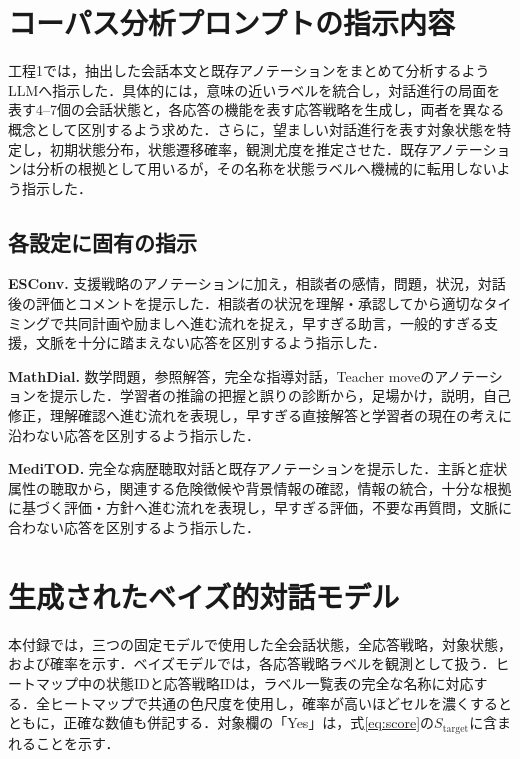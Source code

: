 \section{コーパス分析プロンプトの指示内容}
\label{app:prompts}

工程1では，抽出した会話本文と既存アノテーションをまとめて分析するようLLMへ指示した．具体的には，意味の近いラベルを統合し，対話進行の局面を表す4--7個の会話状態と，各応答の機能を表す応答戦略を生成し，両者を異なる概念として区別するよう求めた．さらに，望ましい対話進行を表す対象状態を特定し，初期状態分布，状態遷移確率，観測尤度を推定させた．既存アノテーションは分析の根拠として用いるが，その名称を状態ラベルへ機械的に転用しないよう指示した．

\subsection{各設定に固有の指示}

\noindent\textbf{ESConv.} 支援戦略のアノテーションに加え，相談者の感情，問題，状況，対話後の評価とコメントを提示した．相談者の状況を理解・承認してから適切なタイミングで共同計画や励ましへ進む流れを捉え，早すぎる助言，一般的すぎる支援，文脈を十分に踏まえない応答を区別するよう指示した．

\noindent\textbf{MathDial.} 数学問題，参照解答，完全な指導対話，Teacher moveのアノテーションを提示した．学習者の推論の把握と誤りの診断から，足場かけ，説明，自己修正，理解確認へ進む流れを表現し，早すぎる直接解答と学習者の現在の考えに沿わない応答を区別するよう指示した．

\noindent\textbf{MediTOD.} 完全な病歴聴取対話と既存アノテーションを提示した．主訴と症状属性の聴取から，関連する危険徴候や背景情報の確認，情報の統合，十分な根拠に基づく評価・方針へ進む流れを表現し，早すぎる評価，不要な再質問，文脈に合わない応答を区別するよう指示した．

\section{生成されたベイズ的対話モデル}
\label{app:models}

\newcommand{\BasisHeatCell}[1]{%
  \cellcolor{basisMatrixHeat!\fpeval{round(#1*85,0)}}\strut #1}

本付録では，三つの固定モデルで使用した全会話状態，全応答戦略，対象状態，および確率を示す．ベイズモデルでは，各応答戦略ラベルを観測として扱う．ヒートマップ中の状態IDと応答戦略IDは，ラベル一覧表の完全な名称に対応する．全ヒートマップで共通の色尺度を使用し，確率が高いほどセルを濃くするとともに，正確な数値も併記する．対象欄の「Yes」は，式\eqref{eq:score}の\(S_{\mathrm{target}}\)に含まれることを示す．

